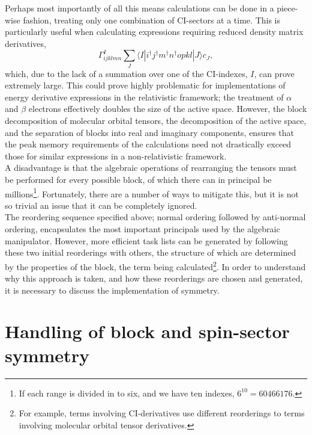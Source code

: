 \noindent Perhaps most importantly of all this means calculations
can be done in a piece-wise fashion, treating only one combination of CI-sectors
at a time. This is particularly useful when calculating expressions requiring reduced density matrix derivatives,
\begin{equation}
\Gamma^{I}_{ijklmn}\sum_{J}\langle I | i^{\dagger}j^{\dagger}m^{\dagger}n^{\dagger}opkl | J \rangle c_{J},
\end{equation}
which, due to the lack of a summation over one of the CI-indexes, $I$, can prove extremely large. 
This could prove highly problematic for implementations of energy derivative expressions in the
relativistic framework; the treatment of $\alpha$ and $\beta$ electrons effectively doubles
the size of the active space. However, the block decomposition of molecular orbital tensors,
the decomposition of the active space, and the separation of blocks into
real and imaginary components, ensures that the peak memory requirements of the 
calculations need not drastically exceed those for similar expressions in a non-relativistic framework.\\

\noindent A disadvantage is that the algebraic operations of
rearranging the tensors must be performed for every possible block, of which
there can in principal be millions\footnote{ If each range is divided in to 
six, and we have ten indexes, $6^{10} =60466176 $. }. Fortunately, there
are a number of ways to mitigate this, but it is not so trivial an issue that it can
be completely ignored.\\

\noindent The reordering sequence specified above; normal ordering followed by anti-normal 
ordering, encapsulates the most important principals used by the algebraic manipulator. However,
more efficient task lists can be generated by following these two initial reorderings with others, the
structure of which are determined by the properties of the block, the term being calculated\footnote{
For example, terms involving CI-derivatives use different reorderings to terms involving molecular orbital
tensor derivatives.}. In order to understand why this approach is taken, and how these reorderings
are chosen and generated, it is necessary to discuss the implementation of symmetry.

\section{Handling of block and spin-sector symmetry}

